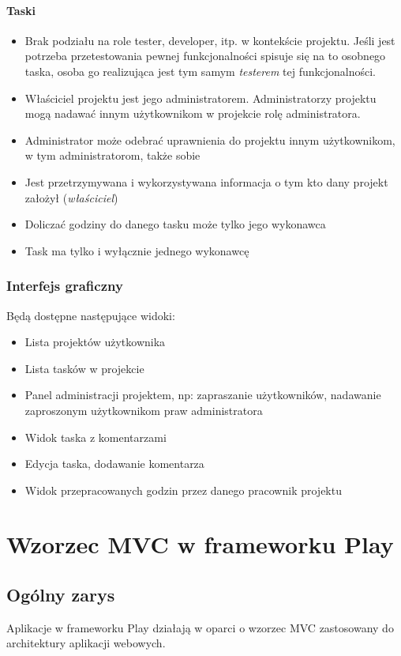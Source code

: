 \documentclass[a4paper,12pt,notitlepage]{mwrep}
\begin{document}
\subsubsection{Taski}
\begin{itemize}
	\item	Brak podziału na role tester, developer, itp. w kontekście projektu.
			Jeśli jest potrzeba przetestowania pewnej funkcjonalności spisuje się na to osobnego taska,
			osoba go realizująca jest tym samym \emph{testerem} tej funkcjonalności.
	\item	Właściciel projektu jest jego administratorem. Administratorzy projektu mogą nadawać innym
			użytkownikom w projekcie rolę administratora.
	\item	Administrator może odebrać uprawnienia do projektu innym użytkownikom, w tym administratorom,
			także sobie
	\item	Jest przetrzymywana i wykorzystywana informacja o tym kto dany projekt założył (\emph{właściciel})
	\item	Doliczać godziny do danego tasku może tylko jego wykonawca
	\item	Task ma tylko i wyłącznie jednego wykonawcę
\end{itemize}


\subsection{Interfejs graficzny}
Będą dostępne następujące widoki:
\begin{itemize}
	\item	Lista projektów użytkownika
	\item	Lista tasków w projekcie
	\item	Panel administracji projektem, np: zapraszanie użytkowników,
			nadawanie zaproszonym użytkownikom praw administratora
	\item	Widok taska z komentarzami
	\item	Edycja taska, dodawanie komentarza
	\item	Widok przepracowanych godzin przez danego pracownik projektu
\end{itemize}


\chapter{Wzorzec MVC w frameworku Play}

\section{Ogólny zarys}
Aplikacje w frameworku Play działają w oparci o wzorzec MVC zastosowany do architektury aplikacji webowych.
\end{document}
